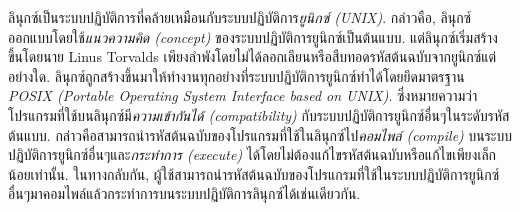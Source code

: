 \begin{thwbr}
{%
ลินุกซ์เป็นระบบปฏิบัติการที่คล้ายเหมือนกับระบบปฏิบัติการ{\em ยูนิกซ์ (UNIX)}. กล่าวคือ, ลินุกซ์ออกแบบโดยใช้{\em แนวความคิด (concept)} ของระบบปฏิบัติการยูนิกซ์เป็นต้นแบบ. แต่ลินุกซ์เริ่มสร้างขึ้นโดยนาย Linus Torvalds เพียงลำพังโดยไม่ได้ลอกเลียนหรือสืบทอดรหัสต้นฉบับจากยูนิกซ์แต่อย่างใด.
ลินุกซ์ถูกสร้างขึ้นมาให้ทำงานทุกอย่างที่ระบบปฏิบัติการยูนิกซ์ทำได้โดยยึดมาตรฐาน {\em
POSIX (Portable Operating System Interface based on UNIX)}. %
%
ซึ่งหมายความว่าโปรแกรมที่ใช้บนลินุกซ์มี{\em ความเข้ากันได้ (compatibility)} กับระบบปฏิบัติการยูนิกซ์อื่นๆในระดับรหัสต้นแบบ. กล่าวคือสามารถนำรหัสต้นฉบับของโปรแกรมที่ใช้ในลินุกซ์ไป{\em คอมไพล์ (compile)} บนระบบปฏิบัติการยูนิกซ์อื่นๆและ{\em กระทำการ (execute)} ได้โดยไม่ต้องแก้ไขรหัสต้นฉบับหรือแก้ไขเพียงเล็กน้อยเท่านั้น. ในทางกลับกัน, ผู้ใช้สามารถนำรหัสต้นฉบับของโปรแกรมที่ใช้ในระบบปฏิบัติการยูนิกซ์อื่นๆมาคอมไพล์แล้วกระทำการบนระบบปฏิบัติการลินุกซ์ได้เช่นเดียวกัน. 

}
\end{thwbr}
